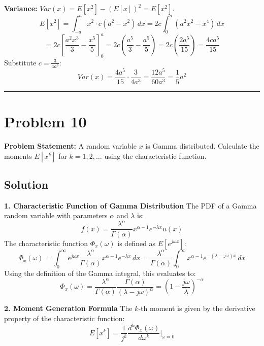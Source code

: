 \documentclass{article}
\begin{document}
\textbf{Variance:} $Var(x) = E[x^2] - (E[x])^2 = E[x^2]$.
\[ E[x^2] = \int_{-a}^{a} x^2 \cdot c(a^2 - x^2) \, dx = 2c \int_{0}^{a} (a^2 x^2 - x^4) \, dx \]
\[ = 2c \left[ \frac{a^2 x^3}{3} - \frac{x^5}{5} \right]_{0}^{a} = 2c \left( \frac{a^5}{3} - \frac{a^5}{5} \right) = 2c \left( \frac{2a^5}{15} \right) = \frac{4c a^5}{15} \]
Substitute $c = \frac{3}{4a^3}$:
\[ Var(x) = \frac{4a^5}{15} \cdot \frac{3}{4a^3} = \frac{12a^5}{60a^3} = \frac{1}{5}a^2 \]

\vspace{1cm}
\hrule
\vspace{1cm}

\section*{Problem 10}

\textbf{Problem Statement:}
A random variable $x$ is Gamma distributed. Calculate the moments $E[x^k]$ for $k=1, 2, \dots$ using the characteristic function.

\subsection*{Solution}

\textbf{1. Characteristic Function of Gamma Distribution}
The PDF of a Gamma random variable with parameters $\alpha$ and $\lambda$ is:
\[ f(x) = \frac{\lambda^\alpha}{\Gamma(\alpha)} x^{\alpha-1} e^{-\lambda x} u(x) \]
The characteristic function $\Phi_x(\omega)$ is defined as $E[e^{j\omega x}]$:
\[ \Phi_x(\omega) = \int_{0}^{\infty} e^{j\omega x} \frac{\lambda^\alpha}{\Gamma(\alpha)} x^{\alpha-1} e^{-\lambda x} \, dx = \frac{\lambda^\alpha}{\Gamma(\alpha)} \int_{0}^{\infty} x^{\alpha-1} e^{-(\lambda - j\omega)x} \, dx \]
Using the definition of the Gamma integral, this evaluates to:
\[ \Phi_x(\omega) = \frac{\lambda^\alpha}{\Gamma(\alpha)} \frac{\Gamma(\alpha)}{(\lambda - j\omega)^\alpha} = \left( 1 - \frac{j\omega}{\lambda} \right)^{-\alpha} \]

\textbf{2. Moment Generation Formula}
The $k$-th moment is given by the derivative property of the characteristic function:
\[ E[x^k] = \frac{1}{j^k} \frac{d^k \Phi_x(\omega)}{d\omega^k} \bigg|_{\omega=0} \]
\end{document}
